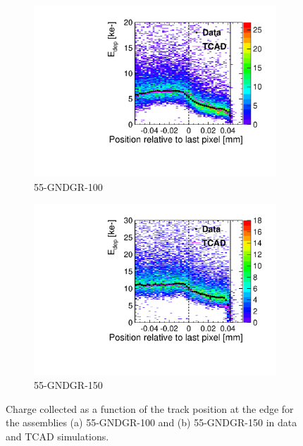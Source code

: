 \begin{figure}[htbp]
  \begin{subfigure}[b]{0.45\textwidth}
    \centering
    \includegraphics[width=\textwidth]{figures/ActiveEdge/55_GNDGR_100_Edep_TCAD_data.pdf}
  \caption{55-GNDGR-100}
  \end{subfigure}\hfill
  \begin{subfigure}[b]{0.45\textwidth}
    \centering
    \includegraphics[width=\textwidth]{figures/ActiveEdge/55_GNDGR_150_Edep_TCAD_data.pdf}
  \caption{55-GNDGR-150}
  \end{subfigure}
  \caption{Charge collected as a function of the track position at the
    edge for the assemblies (a) 55-GNDGR-100 and (b) 55-GNDGR-150 in
    data and TCAD simulations.}
  \label{fig:ChargeCollectionThickGNDGR}
\end{figure}


